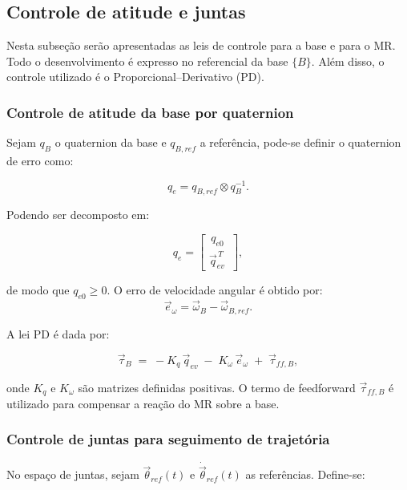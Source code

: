 \subsection{Controle de atitude e juntas}
\label{sec:controle_atitude_juntas}

Nesta subseção serão apresentadas as leis de controle para a base e para o MR. Todo o desenvolvimento é expresso no referencial da base $\{B\}$. Além disso, o controle utilizado é o Proporcional--Derivativo (PD).

\subsubsection{Controle de atitude da base por quaternion}
Sejam $q_{B}$ o quaternion da base e $q_{B,ref}$ a referência, pode-se definir o quaternion de erro como:

\begin{equation}
    q_{e}=q_{B,ref}\otimes q_{B}^{-1}.
\end{equation}

Podendo ser decomposto em:

\begin{equation}
q_{e}=
\begin{bmatrix}
\,q_{e0} \\
\vec q_{ev}^{\,T}\,
\end{bmatrix},
\end{equation}

de modo que $q_{e0}\ge 0$.
O erro de velocidade angular é obtido por:
\begin{equation}
\vec e_\omega=\vec\omega_B-\vec\omega_{B,ref}.
\end{equation}

A lei PD é dada por:

\begin{equation}
\label{eq:tauB_PD}
\vec\tau_B \;=\; -K_q\,\vec q_{ev} \;-\; K_\omega\,\vec e_\omega \;+\; \vec\tau_{ff,B},
\end{equation}

onde $K_q$ e $K_\omega$ são matrizes definidas positivas.
O termo de feedforward $\vec\tau_{ff,B}$ é utilizado para compensar a reação do MR sobre a base.

\subsubsection{Controle de juntas para seguimento de trajetória}

No espaço de juntas, sejam $\vec\theta_{ref}(t)$ e $\dot{\vec\theta}_{ref}(t)$ as referências.
Define-se:

